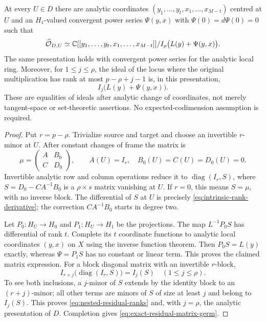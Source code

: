 \begin{theorem}\label{thm:residual-matrix-germ}
At every $U\in D$ there are analytic coordinates
$(y_1,\ldots,y_t,x_1,\ldots,x_{M-t})$ centred at $U$ and an
$H_1$-valued convergent power series $\Psi(y,x)$ with
$\Psi(0)=d\Psi(0)=0$ such that
\begin{equation}\label{eq:exact-residual-matrix-germ}
 \widehat{\mathcal O}_{D,U}\simeq
 \mathbb C[[y_1,\ldots,y_t,x_1,\ldots,x_{M-t}]]
                  /I_\rho\bigl(L(y)+\Psi(y,x)\bigr).
\end{equation}
The same presentation holds with convergent power series for the
analytic local ring. Moreover, for $1\le j\le\rho$, the ideal of
the locus where the original multiplication has rank at most
$p-\rho+j-1$ is, in this presentation,
\begin{equation}\label{eq:nested-residual-ranks}
 I_j\bigl(L(y)+\Psi(y,x)\bigr).
\end{equation}
These are equalities of ideals after analytic change of coordinates,
not merely tangent-space or set-theoretic assertions. No
expected-codimension assumption is required.
\end{theorem}
\begin{proof}
Put $r=p-\rho$. Trivialize source and target and choose an invertible
$r$-minor at $U$. After constant changes of frame the matrix is
\[
 \mu=\begin{pmatrix}A&B_0\\ C&D_0\end{pmatrix},\qquad
 A(U)=I_r,\quad B_0(U)=C(U)=D_0(U)=0.
\]
Invertible analytic row and column operations reduce it to
$\operatorname{diag}(I_r,S)$, where
$S=D_0-CA^{-1}B_0$ is a $\rho\times s$ matrix vanishing at $U$.
If $r=0$, this means $S=\mu$, with no inverse block. The differential
of $S$ at $U$ is precisely \eqref{eq:intrinsic-rank-derivative};
the correction $CA^{-1}B_0$ starts in degree two.

Let $P_0:H_U\to H_0$ and $P_1:H_U\to H_1$ be the projections.
The map $L^{-1}P_0S$ has differential of rank $t$. Complete its
$t$ coordinate functions to analytic local coordinates $(y,x)$ on
$X$ using the inverse function theorem. Then $P_0S=L(y)$ exactly,
whereas $\Psi=P_1S$ has no constant or linear term. This proves the
claimed matrix expression. For a block diagonal matrix with an
invertible $r$-block,
\[
 I_{r+j}\bigl(\operatorname{diag}(I_r,S)\bigr)=I_j(S)
               \quad(1\le j\le\rho).
\]
To see both inclusions, a $j$-minor of $S$ extends by the identity
block to an $(r+j)$-minor; all other terms are minors of $S$ of size
at least $j$ and belong to $I_j(S)$. This proves
\eqref{eq:nested-residual-ranks} and, with $j=\rho$, the analytic
presentation of $D$. Completion gives
\eqref{eq:exact-residual-matrix-germ}.
\end{proof}

